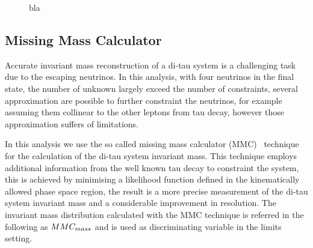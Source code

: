 \begin{figure}[htp]
\begin{center}
    \end{center}
    \caption{bla}
   \label{fig:selections}
\end{figure}


\subsection{Missing Mass Calculator}

 
Accurate invariant mass reconstruction of a di-tau system is a challenging task due to the escaping neutrinos.
In this analysis, with four neutrinos in the final state, the number of unknown largely exceed the number of constraints,
several approximation are possible to further constraint the neutrinos, for example assuming them collinear to the 
other leptons from tau decay, however those approximation suffers of limitations. 

In this analysis we use the so called missing mass calculator (MMC)~\cite{MMC}
technique for the calculation of the di-tau system invariant mass. This technique employs additional 
information from the well known tau decay to constraint the system, this is achieved by minimising a likelihood function 
defined in the kinematically allowed phase space region, the result is a more precise measurement of the di-tau 
system invariant mass and a considerable improvement in resolution. The invariant mass distribution 
calculated with the MMC technique is referred in the following as $MMC_{mass}$ and is used as discriminating 
variable in the limits setting.



